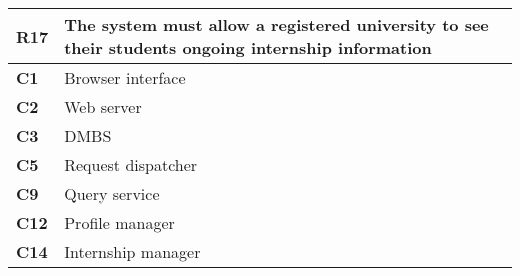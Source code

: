 \begin{table}[H]
    \centering
    \begin{tabular}{|l|m{10cm}|}
        \hline \textbf{R17} & The system must allow a registered university to see their students ongoing internship information \\
        \hline \textbf{C1} & Browser interface \\
        \hline \textbf{C2} & Web server \\
        \hline \textbf{C3} & DMBS \\
        \hline \textbf{C5} & Request dispatcher \\
        \hline \textbf{C9} & Query service \\
        \hline \textbf{C12} & Profile manager \\
        \hline \textbf{C14} & Internship manager \\
        \hline
    \end{tabular}
\end{table}

